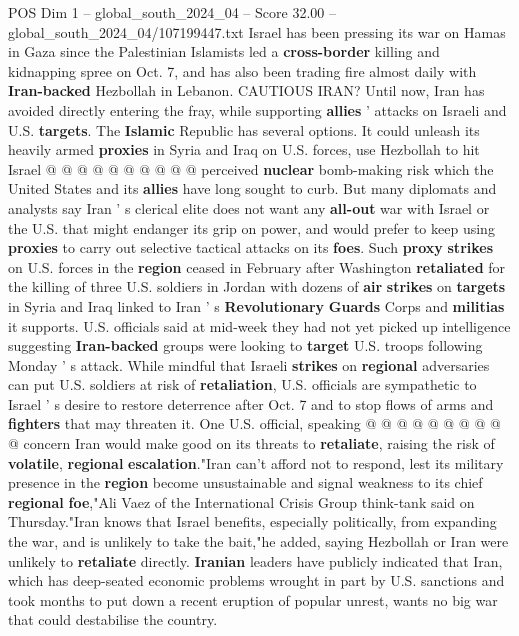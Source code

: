 \begin{textsample}{POS Dim 1 – global\_south\_2024\_04 – Score 32.00 – global\_south\_2024\_04/107199447.txt}
Israel has been pressing its war on Hamas in Gaza since the Palestinian Islamists led a \textbf{cross-border} killing and kidnapping spree on Oct. 7, and has also been trading fire almost daily with \textbf{Iran-backed} Hezbollah in Lebanon.
CAUTIOUS IRAN?
Until now, Iran has avoided directly entering the fray, while supporting \textbf{allies} ' attacks on Israeli and U.S. \textbf{targets}.
The \textbf{Islamic} Republic has several options.
It could unleash its heavily armed \textbf{proxies} in Syria and Iraq on U.S. forces, use Hezbollah to hit Israel @ @ @ @ @ @ @ @ @ @ perceived \textbf{nuclear} bomb-making risk which the United States and its \textbf{allies} have long sought to curb.
But many diplomats and analysts say Iran ' s clerical elite does not want any \textbf{all-out} war with Israel or the U.S. that might endanger its grip on power, and would prefer to keep using \textbf{proxies} to carry out selective tactical attacks on its \textbf{foes}.
Such \textbf{proxy} \textbf{strikes} on U.S. forces in the \textbf{region} ceased in February after Washington \textbf{retaliated} for the killing of three U.S. soldiers in Jordan with dozens of \textbf{air} \textbf{strikes} on \textbf{targets} in Syria and Iraq linked to Iran ' s \textbf{Revolutionary} \textbf{Guards} Corps and \textbf{militias} it supports.
U.S. officials said at mid-week they had not yet picked up intelligence suggesting \textbf{Iran-backed} groups were looking to \textbf{target} U.S. troops following Monday ' s attack.
While mindful that Israeli \textbf{strikes} on \textbf{regional} adversaries can put U.S. soldiers at risk of \textbf{retaliation}, U.S. officials are sympathetic to Israel ' s desire to restore deterrence after Oct. 7 and to stop flows of arms and \textbf{fighters} that may threaten it.
One U.S. official, speaking @ @ @ @ @ @ @ @ @ @ concern Iran would make good on its threats to \textbf{retaliate}, raising the risk of \textbf{volatile}, \textbf{regional} \textbf{escalation}."Iran can't afford not to respond, lest its military presence in the \textbf{region} become unsustainable and signal weakness to its chief \textbf{regional} \textbf{foe},"Ali Vaez of the International Crisis Group think-tank said on Thursday."Iran knows that Israel benefits, especially politically, from expanding the war, and is unlikely to take the bait,"he added, saying Hezbollah or Iran were unlikely to \textbf{retaliate} directly. \textbf{Iranian} leaders have publicly indicated that Iran, which has deep-seated economic problems wrought in part by U.S. sanctions and took months to put down a recent eruption of popular unrest, wants no big war that could destabilise the country.

\end{textsample}
